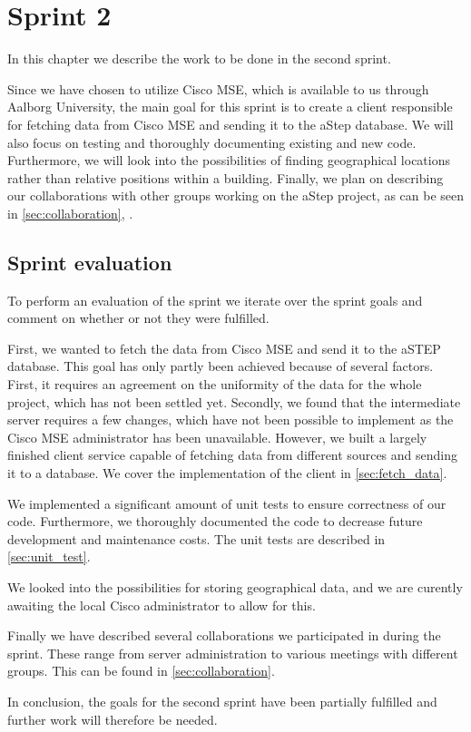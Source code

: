 \chapter{Sprint 2} \label{cha:sprint2}
In this chapter we describe the work to be done in the second sprint. 

Since we have chosen to utilize Cisco MSE, which is available to us through Aalborg University, the main goal for this sprint is to create a client responsible for fetching data from Cisco MSE and sending it to the aStep database. We will also focus on testing and thoroughly documenting existing and new code. Furthermore, we will look into the possibilities of finding geographical locations rather than relative positions within a building. Finally, we plan on describing our collaborations with other groups working on the aStep project, as can be seen in \cref{sec:collaboration}, .





\section{Sprint evaluation}
To perform an evaluation of the sprint we iterate over the sprint goals and comment on whether or not they were fulfilled.

First, we wanted to fetch the data from Cisco MSE and send it to the aSTEP database. This goal has only partly been achieved because of several factors. First, it requires an agreement on the uniformity of the data for the whole project, which has not been settled yet. Secondly, we found that the intermediate server requires a few changes, which have not been possible to implement as the Cisco MSE administrator has been unavailable. However, we built a largely finished client service capable of fetching data from different sources and sending it to a database. We cover the implementation of the client in \cref{sec:fetch_data}.

We implemented a significant amount of unit tests to ensure correctness of our code. Furthermore, we thoroughly documented the code to decrease future development and maintenance costs. The unit tests are described in \cref{sec:unit_test}.

We looked into the possibilities for storing geographical data, and we are curently awaiting the local Cisco administrator to allow for this.

Finally we have described several collaborations we participated in during the sprint. These range from server administration to various meetings with different groups. This can be found in \cref{sec:collaboration}. 

In conclusion, the goals for the second sprint have been partially fulfilled and further work will therefore be needed.